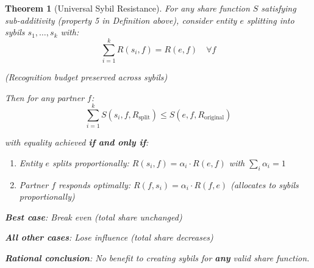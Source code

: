 \documentclass[11pt,a4paper]{article}
\newtheorem{theorem}{Theorem}[section]
\theoremstyle{definition}
\theoremstyle{remark}
\begin{document}
\begin{theorem}[Universal Sybil Resistance]
For any share function $S$ satisfying sub-additivity (property 5 in Definition above), consider entity $e$ splitting into sybils $s_1, \ldots, s_k$ with:
\[ \sum_{i=1}^k R(s_i, f) = R(e,f) \quad \forall f \]

(Recognition budget preserved across sybils)

Then for any partner $f$:
\[ \sum_{i=1}^k S(s_i, f, R_{\text{split}}) \le S(e, f, R_{\text{original}}) \]

with equality achieved \textbf{if and only if}:
\begin{enumerate}
\item Entity $e$ splits proportionally: $R(s_i, f) = \alpha_i \cdot R(e,f)$ with $\sum_i \alpha_i = 1$
\item Partner $f$ responds optimally: $R(f, s_i) = \alpha_i \cdot R(f,e)$ (allocates to sybils proportionally)
\end{enumerate}

\textbf{Best case}: Break even (total share unchanged)

\textbf{All other cases}: Lose influence (total share decreases)

\textbf{Rational conclusion}: No benefit to creating sybils for \textbf{any} valid share function.
\end{theorem}
\end{document}

